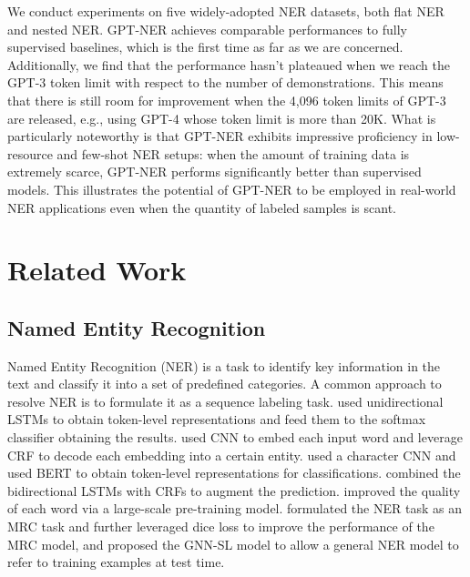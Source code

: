 \documentclass[11pt]{article}
\begin{document}
We conduct experiments on five widely-adopted NER datasets, both flat NER and nested NER. 
GPT-NER achieves comparable performances to fully supervised baselines, which is the first time as far as we are concerned.
Additionally, 
we find that the performance hasn't plateaued when we reach the GPT-3 token limit with respect to the number of demonstrations. 
This means that 
there is still room for improvement
when the 4,096 token limits of GPT-3 are released, e.g., using GPT-4 whose token limit is more than 20K.
What is particularly noteworthy is that GPT-NER exhibits impressive proficiency in low-resource and few-shot NER setups: when the amount of training data is extremely scarce,  GPT-NER performs significantly better than supervised models.
This illustrates the potential of GPT-NER to be employed in real-world NER applications even when the quantity of labeled samples is scant.



\section{Related Work}

\subsection{Named Entity Recognition}
Named Entity Recognition (NER) is a task to identify key information in the text and classify it into a set of predefined categories. A common approach
to resolve NER is to 
 formulate it as a sequence labeling task.  used unidirectional LSTMs to obtain token-level representations and feed them to the softmax classifier obtaining the results. 
  used CNN to embed each input word and leverage CRF to decode each embedding into a certain entity.
    used a character CNN  
  and  used BERT to obtain token-level representations for classifications. 
   combined the bidirectional LSTMs with CRFs to augment the prediction. 
   improved the quality of each word via a large-scale pre-training model.
   formulated the NER task as an MRC task and further leveraged dice loss to improve the performance of the MRC model, and  proposed the GNN-SL model to allow a general NER model to refer to training examples at test time.
\end{document}
